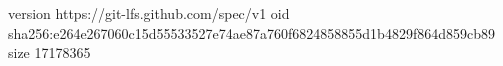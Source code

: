 version https://git-lfs.github.com/spec/v1
oid sha256:e264e267060c15d55533527e74ae87a760f6824858855d1b4829f864d859cb89
size 17178365
